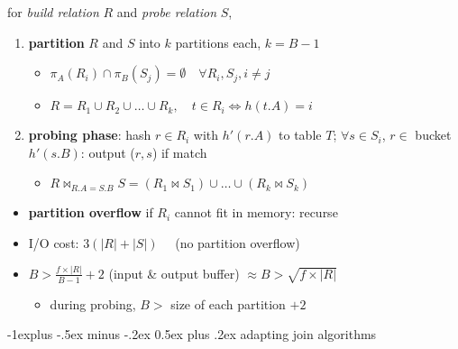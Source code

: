 \documentclass[10pt, landscape]{article}
\makeatletter
\renewcommand{\subsection}{\@startsection{subsection}{2}{0mm}%
  {-1explus -.5ex minus -.2ex}%
  {0.5ex plus .2ex}%
{\normalfont\normalsize\bfseries}}
\makeatother
\begin{document}
\begin{multicols*}{4}
  for \textit{build relation} $R$ and \textit{probe relation} $S$,
  \begin{enumerate}
    \item \textbf{partition} $R$ and $S$ into  $k$ partitions each, $k=B-1$
          \begin{itemize}
            \item $\pi_A(R_i) \cap \pi_B(S_j) = \emptyset \quad \forall R_i, S_j, i \neq j$
            \item $R = R_1 \cup R_2 \cup \dots \cup R_k, \quad t \in R_i \iff h(t.A)=i$
          \end{itemize}
    \item \textbf{probing phase}: hash $r \in R_i$ with $h'(r.A)$ to table $T$;
          $\forall s \in S_i$, $r \in$ bucket $h'(s.B)$: output ($r,s$) if match
          \begin{itemize}
            \item $R \bowtie_{R.A=S.B} S = (R_1 \bowtie S_1) \cup \dots \cup (R_k \bowtie S_k)$
          \end{itemize}
  \end{enumerate}

  \begin{itemize}
    \item \textbf{partition overflow} if $R_i$ cannot fit in memory: recurse
    \item I/O cost: $3(|R|+|S|) \quad$ (no partition overflow)
    \item $B > \frac{f \times |R|}{B-1} + 2$ (input \& output buffer) $\approx B > \sqrt{f\times |R|}$
          \begin{itemize}
            \item during probing, $B >$ size of each partition $+ 2$
          \end{itemize}
  \end{itemize}

  \subsection{adapting join algorithms}


\end{multicols*}
\end{document}
